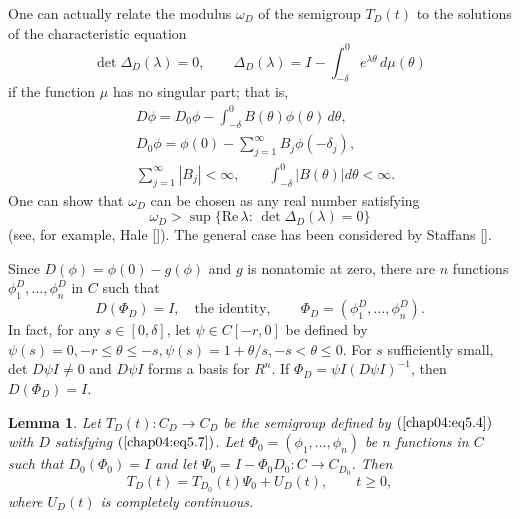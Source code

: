 \documentclass{surv-l}
\theoremstyle{plain}
\newtheorem{lemma}[theorem]{Lemma}
\theoremstyle{definition}
\numberwithin{equation}{section}
\numberwithin{figure}{chapter}
\begin{document}
One can actually relate the modulus $\omega_{D}$ of the semigroup $T_{D}(t)$ to the solutions of the characteristic equation
\begin{equation}\label{chap04:eq5.6}
\det\Delta_{D}(\lambda)=0,\qquad \Delta_{D}(\lambda)=I-\int_{-\delta}^{0}e^{\lambda\theta}\, d\mu(\theta)
\end{equation}
if the function $\mu$ has no singular part; that is,
\begin{equation}\label{chap04:eq5.7}
\begin{split}
&D\phi=D_{0}\phi-\int_{-\delta}^{0}B(\theta)\phi(\theta)\, d\theta,\\
&D_{0}\phi=\phi(0)-\sum_{j=1}^{\infty}B_{j}\phi(-\delta_{j}), \\
&\sum_{j=1}^{\infty}|B_{j}|<\infty,\qquad \int_{-\delta}^{0}|B(\theta)|d\theta<\infty.
\end{split}
\end{equation}
One can show that $\omega_{D}$ can be chosen as any real number satisfying
\begin{equation}\label{chap04:eq5.8}
\omega_{D}>\sup\{\mathrm{Re}\,\lambda\!:\,\det\Delta_{D}(\lambda)=0\}
\end{equation}
(see, for example, Hale [\citeyear{1977h}]). The general case has been considered by Staffans [\citeyear{1982s}].

Since $D(\phi)=\phi(0)-g(\phi)$ and $g$ is nonatomic at zero, there are $n$ functions $\phi_{1}^{D},\ldots, \phi_{n}^{D}$ in $C$ such that
\begin{equation}\label{chap04:eq5.9}
D(\Phi_{D})=I,\quad\text{the identity},\qquad \Phi_{D}=(\phi_{1}^{D},\ldots, \phi_{n}^{D}).
\end{equation}
In fact, for any $s\in[0, \delta]$, let $\psi\in C[-r, 0]$ be defined by $\psi(s)=0, -r\leq\theta\leq-s, \psi(s)=1+\theta/s, -s<\theta\leq 0$. For $s$ sufficiently small, det $D\psi I\neq 0$ and $D\psi I$ forms a basis for $R^{n}$. If $\Phi_{D}=\psi I(D\psi I)^{-1}$, then $D(\Phi_{D})=I$.



\begin{lemma}\label{lem4.5.1} Let $T_{D}(t)\!: C_{D}\rightarrow C_{D}$ be the semigroup defined by $(\ref{chap04:eq5.4})$
with $D$ satisfying $(\ref{chap04:eq5.7})$. Let $\Phi_{0}=(\phi_{1},\ldots, \phi_{n})$ be $n$ functions in $C$ such that $D_{0}(\Phi_{0})=I$ and let $\Psi_{0}=I-\Phi_{0}D_{0}: C\rightarrow C_{D_{0}}$. Then
\begin{equation}\label{chap04:eq5.10}
T_{D}(t)=T_{D_{0}}(t)\Psi_{0}+U_{D}(t),\qquad t\geq 0,
\end{equation}
where $U_{D}(t)$ is completely continuous.
\end{lemma}
\end{document}
